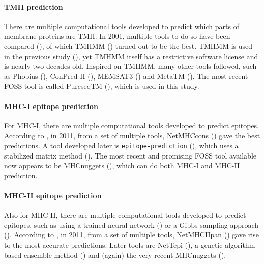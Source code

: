 \paragraph{TMH prediction}

There are multiple computational tools developed to predict which
parts of membrane proteins are TMH.
In 2001, multiple tools to do so have been compared (\cite{moller2001evaluation}),
of which TMHMM (\cite{krogh2001predicting}) turned out to be the best.
TMHMM is used in the previous study (\cite{bianchi2017}),
yet TMHMM itself has a restrictive software license and is nearly two
decades old. 
Inspired on TMHMM, many other tools followed, such as 
Phobius (\cite{kall2004combined}),
ConPred II (\cite{arai2004conpred}),
MEMSAT3 (\cite{jones2007improving})
and MetaTM (\cite{klammer2009metatm}).
The most recent FOSS tool is called PureseqTM (\cite{wang2019efficient}),
which is used in this study.

\paragraph{MHC-I epitope prediction}

For MHC-I, there are multiple computational tools developed 
to predict epitopes. 
According to \cite{lundegaard2011prediction}, in 2011,
from a set of multiple tools, 
NetMHCcons (\cite{karosiene2012netmhccons}) gave the best predictions.
A tool developed later is \verb;epitope-prediction; (\cite{bianchi2017}),
which uses a stabilized matrix method (\cite{kim2009derivation}).
The most recent and promising FOSS tool available now appears
to be MHCnuggets (\cite{shao2020high}), which can do both MHC-I 
and MHC-II prediction.

\paragraph{MHC-II epitope prediction}

Also for MHC-II, there are multiple computational tools developed 
to predict epitopes,
such as using a trained neural network (\cite{nielsen2003reliable})
or a Gibbs sampling approach (\cite{nielsen2004improved}).
According to \cite{lundegaard2011prediction}, in 2011,
from a set of multiple tools, 
NetMHCIIpan (\cite{nielsen2008quantitative,karosiene2013netmhciipan})
gave rise to the most accurate predictions.
Later tools are NetTepi (\cite{trolle2014nettepi}),
a genetic-algorithm-based ensemble method (\cite{zhang2015accurate})
and (again) the very recent MHCnuggets (\cite{shao2020high}).

